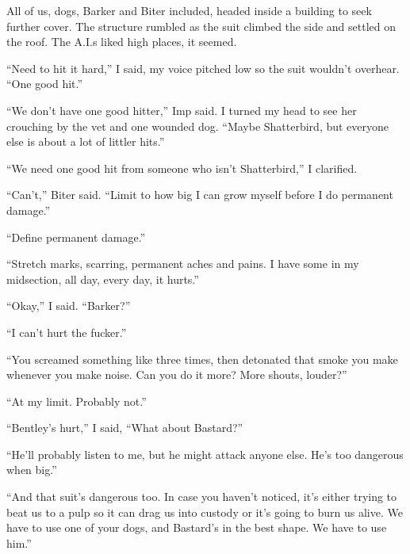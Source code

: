 All of us, dogs, Barker and Biter included, headed inside a building to seek further cover.  The structure rumbled as the suit climbed the side and settled on the roof.  The A.I.s liked high places, it seemed.



``Need to hit it hard,'' I said, my voice pitched low so the suit wouldn't overhear.  ``One good hit.''



``We don't have one good hitter,'' Imp said.  I turned my head to see her crouching by the vet and one wounded dog.  ``Maybe Shatterbird, but everyone else is about a lot of littler hits.''



``We need one good hit from someone who isn't Shatterbird,'' I clarified.



``Can't,'' Biter said.  ``Limit to how big I can grow myself before I do permanent damage.''



``Define permanent damage.''



``Stretch marks, scarring, permanent aches and pains.  I have some in my midsection, all day, every day, it hurts.''



``Okay,'' I said.  ``Barker?''



``I can't hurt the fucker.''



``You screamed something like three times, then detonated that smoke you make whenever you make noise.  Can you do it more?  More shouts, louder?''



``At my limit.  Probably not.''



``Bentley's hurt,'' I said, ``What about Bastard?''



``He'll probably listen to me, but he might attack anyone else.  He's too dangerous when big.''



``And that suit's dangerous too.  In case you haven't noticed, it's either trying to beat us to a pulp so it can drag us into custody or it's going to burn us alive.  We have to use one of your dogs, and Bastard's in the best shape.  We have to use him.''



